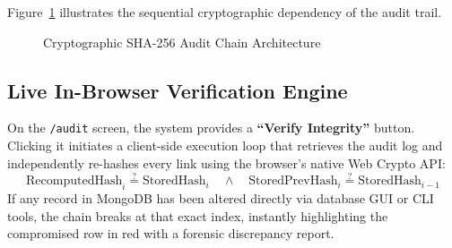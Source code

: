 \documentclass[12pt,a4paper,oneside]{report}
\begin{document}
Figure~\ref{fig:hash_chain} illustrates the sequential cryptographic dependency of the audit trail.

\begin{figure}[h!]
\centering
{}
\caption{Cryptographic SHA-256 Audit Chain Architecture}
\label{fig:hash_chain}
\end{figure}

\subsection{Live In-Browser Verification Engine}
On the \texttt{/audit} screen, the system provides a \textbf{``Verify Integrity''} button. Clicking it initiates a client-side execution loop that retrieves the audit log and independently re-hashes every link using the browser's native Web Crypto API:
$$\text{RecomputedHash}_i \stackrel{?}{=} \text{StoredHash}_i \quad \wedge \quad \text{StoredPrevHash}_i \stackrel{?}{=} \text{StoredHash}_{i-1}$$
If any record in MongoDB has been altered directly via database GUI or CLI tools, the chain breaks at that exact index, instantly highlighting the compromised row in red with a forensic discrepancy report.
\end{document}
